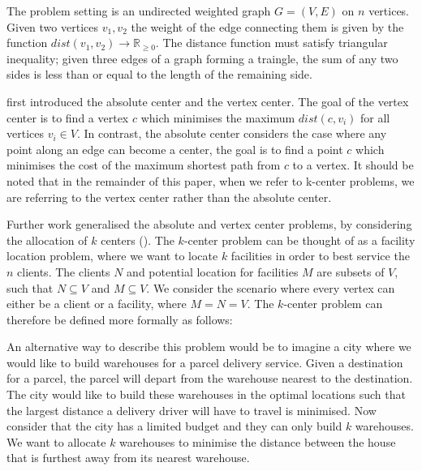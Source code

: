 The problem setting is an undirected weighted graph $G=(V,E)$ on $n$ vertices. Given two vertices $v_1, v_2$ the weight of the edge connecting them is given by the function $dist(v_1,v_2)\rightarrow\mathbb{R}_{\ge 0}$. The distance function must satisfy triangular inequality; given three edges of a graph forming a traingle, the sum of any two sides is less than or equal to the length of the remaining side.

\textcite{hakimi_optimum_1964} first introduced the absolute center and the vertex center. The goal of the vertex center is to find a vertex $c$ which minimises the maximum $dist(c, v_i)$ for all vertices $v_i\in V$. In contrast, the absolute center considers the case where any point along an edge can become a center, the goal is to find a point $c$ which minimises the cost of the maximum shortest path from $c$ to a vertex. It should be noted that in the remainder of this paper, when we refer to k-center problems, we are referring to the vertex center rather than the absolute center.

Further work generalised the absolute and vertex center problems, by considering the allocation of $k$ centers (\cite{hakimi_optimum_1965}). The $k$-center problem can be thought of as a facility location problem, where we want to locate $k$ facilities in order to best service the $n$ clients. The clients $N$ and potential location for facilities $M$ are subsets of $V$, such that $N\subseteq V$ and $M\subseteq V$. We consider the scenario where every vertex can either be a client or a facility, where $M=N=V$. The $k$-center problem can therefore be defined more formally as follows:


An alternative way to describe this problem would be to imagine a city where we would like to build warehouses for a parcel delivery service. Given a destination for a parcel, the parcel will depart from the warehouse nearest to the destination. The city would like to build these warehouses in the optimal locations such that the largest distance a delivery driver will have to travel is minimised. Now consider that the city has a limited budget and they can only build $k$ warehouses. We want to allocate $k$ warehouses to minimise the distance between the house that is furthest away from its nearest warehouse.

